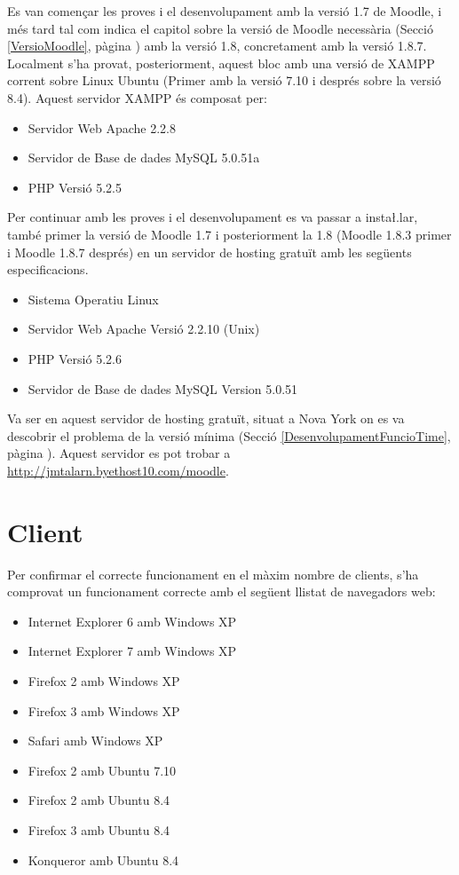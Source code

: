 \documentclass[a4paper]{report}  %
\begin{document}
Es van començar les proves i el desenvolupament amb la versió 1.7 de Moodle, i més tard tal com indica el capitol sobre la versió de Moodle necessària (Secció \ref{VersioMoodle}, pàgina \pageref{VersioMoodle} ) amb la versió 1.8, concretament amb la versió 1.8.7.\\
Localment s'ha provat, posteriorment, aquest bloc amb una versió de XAMPP corrent sobre Linux Ubuntu (Primer amb la versió 7.10 i després sobre la versió 8.4). Aquest servidor XAMPP és composat per:
\begin{itemize}
	\item Servidor Web Apache 2.2.8
	\item Servidor de Base de dades MySQL 5.0.51a
	\item PHP Versió 5.2.5 
\end{itemize}

Per continuar amb les proves i el desenvolupament es va passar a insta\l.lar, també primer la versió de Moodle 1.7 i posteriorment la 1.8 (Moodle 1.8.3 primer i Moodle 1.8.7 després) en un servidor de hosting gratuït amb les següents especificacions.
\begin{itemize}
	\item Sistema Operatiu Linux
	\item Servidor Web Apache Versió 2.2.10 (Unix)
	\item PHP Versió 5.2.6
	\item Servidor de Base de dades MySQL Version 5.0.51
\end{itemize}
Va ser en aquest servidor de hosting gratuït, situat a Nova York on es va descobrir el problema de la versió mínima (Secció \ref{DesenvolupamentFuncioTime}, pàgina \pageref{DesenvolupamentFuncioTime}). Aquest servidor es pot trobar a \url{http://jmtalarn.byethost10.com/moodle}.
\section{Client}
Per confirmar el correcte funcionament en el màxim nombre de clients, s'ha comprovat un funcionament correcte amb el següent llistat de navegadors web:
\begin{itemize}
	\item Internet Explorer 6 amb Windows XP
	\item Internet Explorer 7 amb Windows XP
	\item Firefox 2 amb Windows XP
	\item Firefox 3 amb Windows XP
	\item Safari amb Windows XP 
	\item Firefox 2 amb Ubuntu 7.10
	\item Firefox 2 amb Ubuntu 8.4
	\item Firefox 3 amb Ubuntu 8.4
	\item Konqueror amb Ubuntu 8.4 
\end{itemize}
\end{document}
